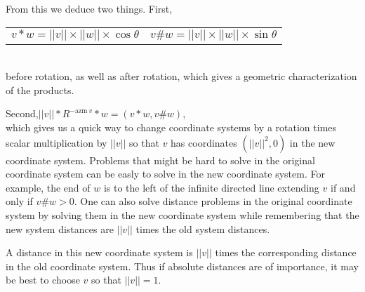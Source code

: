 \documentclass[12pt]{article}
\begin{document}
From this we deduce two things.  First, \\
\hspace*{0.5in}
    \begin{tabular}{l@{~~~~~}l}
    $v*w=||v||\times||w||\times\cos\theta$ &
    $v\#w=||v||\times||w||\times\sin\theta$ \\
    \end{tabular} \\
before rotation, as well as after rotation,
which gives a geometric characterization of the products.

Second,\hspace{0.5in}$||v||*R^{-\mathrm{azm}~v}*w=(v*w,v\#w)$,
\\[1ex]
which gives us a quick way to change coordinate systems
by a rotation times scalar multiplication by $||v||$ so that
$v$ has coordinates $(||v||^2,0)$ in the new coordinate system.
Problems that might be hard to solve in the original
coordinate system can be easly to solve in the new coordinate
system.  For example, the end of $w$ is to the left of the infinite directed
line extending $v$ if and only if $v\#w>0$.  One can also solve
distance problems in the original coordinate system by solving them
in the new coordinate system while remembering that the new system distances
are $||v||$ times the old system distances.

A distance in
this new coordinate system is $||v||$ times the corresponding
distance in the old coordinate system.  Thus if absolute distances are
of importance, it may be best to choose $v$ so that $||v||=1$.

\bigskip
\end{document}
